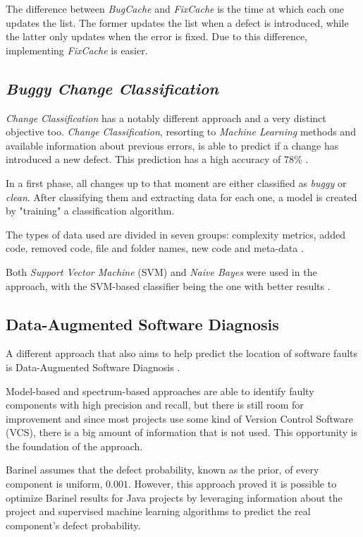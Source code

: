 The difference between \emph{BugCache} and \emph{FixCache} is the time at which each one updates the list. The former updates the list when a defect is introduced, while the latter only updates when the error is fixed. Due to this difference, implementing \emph{FixCache} is easier.

\subsection{\emph{Buggy Change Classification}}

\emph{Change Classification} has a notably different approach and a very distinct objective too. \emph{Change Classification}, resorting to \emph{Machine Learning} methods and available information about previous errors, is able to predict if a change has introduced a new defect. This prediction has a high accuracy of 78\% \cite{Whitehead2008}.

In a first phase, all changes up to that moment are either classified as \emph{buggy} or \emph{clean}. After classifying them and extracting data for each one, a model is created by "training" a classification algorithm.

The types of data used are divided in seven groups: complexity metrics, added code, removed code, file and folder names, new code and meta-data \cite{Whitehead2008}.

Both \emph{Support Vector Machine} (SVM) and \emph{Naive Bayes} were used in the approach, with the SVM-based classifier being the one with better results \cite{Whitehead2008}.

\subsection{Data-Augmented Software Diagnosis} \label{subsec:elmishali}

A different approach that also aims to help predict the location of software faults is Data-Augmented Software Diagnosis \cite{Elmishali}.

Model-based and spectrum-based approaches are able to identify faulty components with high precision and recall, but there is still room for improvement and since most projects use some kind of Version Control Software (VCS), there is a big amount of information that is not used. This opportunity is the foundation of the approach.

Barinel assumes that the defect probability, known as the prior, of every component is uniform, $0.001$. However, this approach proved it is possible to optimize Barinel results for Java projects by leveraging information about the project and supervised machine learning algorithms to predict the real component's defect probability.

